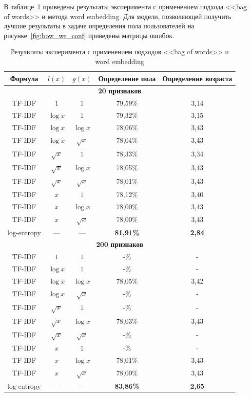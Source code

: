 В таблице~\ref{tab:bow_we} приведены результаты эксперимента
с применением подхода <<bag of words>> и метода word embedding.
Для модели, позволяющей получить лучшие результаты в задаче
определения пола пользователей на рисунке~\ref{fig:bow_we_conf}
приведены матрицы ошибок.

\begin{table}[!h]
    \caption{Результаты эксперимента с применением подходов
            <<bag of words>> и word embedding}
    \label{tab:bow_we}
\centering
\begin{tabular}{|c|c|c|c|c|}\hline
    \textbf{Формула} & \boldmath$l(x)$ & \boldmath$g(x)$ & \textbf{Определение пола} & \textbf{Определение возраста} \\\hline
    \multicolumn{5}{|c|}{\textbf{20 признаков}} \\\hline
    TF-IDF & $1$ & $1$ & 79,59\% & 3,14 \\\hline
    TF-IDF & $\log{x}$ & $1$ & 79,32\% & 3,15 \\\hline
    TF-IDF & $\log{x}$ & $\log{x}$ & 78,06\% & 3,43 \\\hline
    TF-IDF & $\log{x}$ & $\sqrt{x}$ & 78,04\% & 3,43 \\\hline
    TF-IDF & $\sqrt{x}$ & $1$ & 78,33\% & 3,34 \\\hline
    TF-IDF & $\sqrt{x}$ & $\log{x}$ & 78,05\% & 3,43 \\\hline
    TF-IDF & $\sqrt{x}$ & $\sqrt{x}$ & 78,01\% & 3,43 \\\hline
    TF-IDF & $x$ & $1$ & 78,12\% & 3,40 \\\hline
    TF-IDF & $x$ & $\log{x}$ & 78,00\% & 3,43 \\\hline
    TF-IDF & $x$ & $\sqrt{x}$ & 78,00\% & 3,43 \\\hline
    log-entropy & --- & --- & \textbf{81,91\%} & \textbf{2,84} \\\hline
    \multicolumn{5}{|c|}{\textbf{200 признаков}} \\\hline
    TF-IDF & $1$ & $1$ & -\% & - \\\hline
    TF-IDF & $\log{x}$ & $1$ & -\% & - \\\hline
    TF-IDF & $\log{x}$ & $\log{x}$ & 78,05\% & 3,42 \\\hline
    TF-IDF & $\log{x}$ & $\sqrt{x}$ & -\% & - \\\hline
    TF-IDF & $\sqrt{x}$ & $1$ & -\% & - \\\hline
    TF-IDF & $\sqrt{x}$ & $\log{x}$ & 78,03\% & 3,43 \\\hline
    TF-IDF & $\sqrt{x}$ & $\sqrt{x}$ & -\% & - \\\hline
    TF-IDF & $x$ & $1$ & -\% & - \\\hline
    TF-IDF & $x$ & $\log{x}$ & 78,01\% & 3,43 \\\hline
    TF-IDF & $x$ & $\sqrt{x}$ & 78,00\% & 3,43 \\\hline
    log-entropy & --- & --- & \textbf{83,86\%} & \textbf{2,65} \\\hline
\end{tabular}
\end{table}

